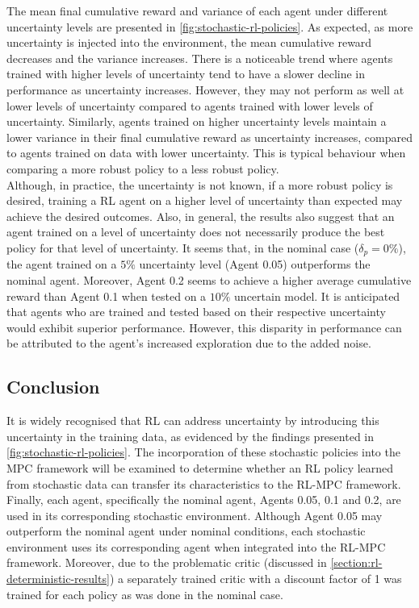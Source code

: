 The mean final cumulative reward and variance of each agent under different uncertainty levels are presented in \ref{fig:stochastic-rl-policies}. As expected, as more uncertainty is injected into the environment, the mean cumulative reward decreases and the variance increases. There is a noticeable trend where agents trained with higher levels of uncertainty tend to have a slower decline in performance as uncertainty increases. However, they may not perform as well at lower levels of uncertainty compared to agents trained with lower levels of uncertainty. Similarly, agents trained on higher uncertainty levels maintain a lower variance in their final cumulative reward as uncertainty increases, compared to agents trained on data with lower uncertainty. This is typical behaviour when comparing a more robust policy to a less robust policy.\\
Although, in practice, the uncertainty is not known, if a more robust policy is desired, training a RL agent on a higher level of uncertainty than expected may achieve the desired outcomes. Also, in general, the results also suggest that an agent trained on a level of uncertainty does not necessarily produce the best policy for that level of uncertainty. It seems that, in the nominal case ($\delta_p = 0\%$), the agent trained on a $5\%$ uncertainty level (Agent 0.05) outperforms the nominal agent. Moreover, Agent 0.2 seems to achieve a higher average cumulative reward than Agent 0.1 when tested on a $10\%$ uncertain model. It is anticipated that agents who are trained and tested based on their respective uncertainty would exhibit superior performance. However, this disparity in performance can be attributed to the agent’s increased exploration due to the added noise.

\subsection{Conclusion}
It is widely recognised that RL can address uncertainty by introducing this uncertainty in the training data, as evidenced by the findings presented in \autoref{fig:stochastic-rl-policies}. The incorporation of these stochastic policies into the MPC framework will be examined to determine whether an RL policy learned from stochastic data can transfer its characteristics to the RL-MPC framework. Finally, each agent, specifically the nominal agent, Agents 0.05, 0.1 and 0.2, are used in its corresponding stochastic environment. Although Agent 0.05 may outperform the nominal agent under nominal conditions, each stochastic environment uses its corresponding agent when integrated into the RL-MPC framework. Moreover, due to the problematic critic (discussed in \autoref{section:rl-deterministic-results}) a separately trained critic with a discount factor of 1 was trained for each policy as was done in the nominal case.

